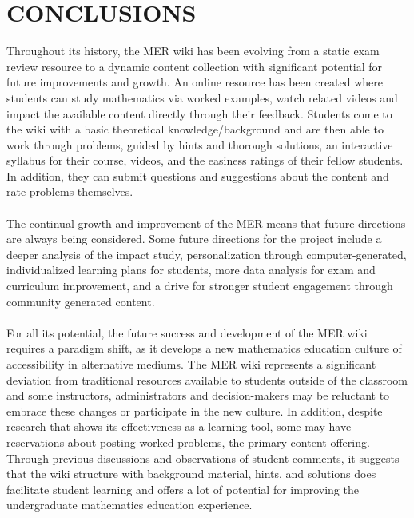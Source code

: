 \documentclass{primus}
\begin{document}
\section{CONCLUSIONS}\label{sec:Conclusions}
Throughout its history, the MER wiki has been evolving from a static exam review resource to a dynamic content collection with significant potential for future improvements and growth. An online resource has been created where students can study mathematics via worked examples, watch related videos and impact the available content directly through their feedback. Students come to the wiki with a basic theoretical knowledge/background and are then able to work through problems, guided by hints and thorough solutions, an interactive syllabus for their course, videos, and the easiness ratings of their fellow students. In addition, they can submit questions and suggestions about the content and rate problems themselves.
\\\\
\noindent{}The continual growth and improvement of the MER means that future directions are always being considered. Some future directions for the project include a deeper analysis of the impact study, personalization through computer-generated, individualized learning plans for students, more data analysis for exam and curriculum improvement, and a drive for stronger student engagement through community generated content.
\\\\
\noindent{}For all its potential, the future success and development of the MER wiki requires a paradigm shift, as it develops a new mathematics education culture of accessibility in alternative mediums. The MER wiki represents a significant deviation from traditional resources available to students outside of the classroom and some instructors, administrators and decision-makers may be reluctant to embrace these changes or participate in the new culture. In addition, despite research that shows its effectiveness as a learning tool, some may have reservations about posting worked problems, the primary content offering. Through previous discussions and observations of student comments, it suggests that the wiki structure with background material, hints, and solutions does facilitate student learning and offers a lot of potential for improving the undergraduate mathematics education experience.
\\\\
\end{document}
